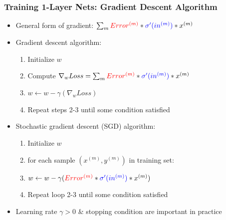 \documentclass{beamer}
\newcommand{\bi}{\begin{itemize}}
\newcommand{\ei}{\end{itemize}}
\newcommand{\be}{\begin{enumerate}}
\newcommand{\ee}{\end{enumerate}}
\begin{document}
\begin{frame}
\frametitle{Training 1-Layer Nets: Gradient Descent Algorithm}
\bi
\item General form of gradient: $\sum_m{\color{red} Error^{(m)}} * {\color{blue} \sigma'(in^{(m)})} * x^{(m)}$
\item Gradient descent algorithm:
	\be
	\item Initialize $w$
	\item Compute $\nabla_w Loss = \sum_m{\color{red} Error^{(m)}} * {\color{blue} \sigma'(in^{(m)})} * x^{(m)}$
	\item $w \leftarrow w - \gamma( \nabla_w Loss )$
	\item Repeat steps 2-3 until some condition satisfied 
	\ee
\pause
\item Stochastic gradient descent (SGD) algorithm:
	\be
	\item Initialize $w$
	\item for each sample $(x^{(m)},y^{(m)})$ in training set:
	\item \hspace{1cm} $w \leftarrow w - \gamma({\color{red} Error^{(m)}} * {\color{blue} \sigma'(in^{(m)})} * x^{(m)})$
	\item Repeat loop 2-3 until some condition satisfied 
	\ee
\pause
\item Learning rate $\gamma>0$  \& stopping condition are important in practice
\ei
\end{frame}
\end{document}
